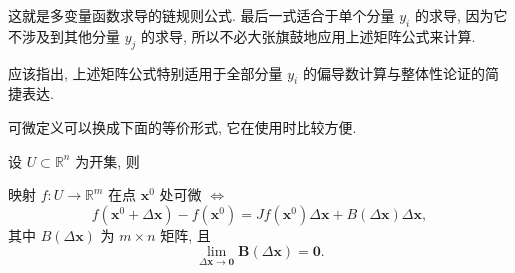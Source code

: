这就是多变量函数求导的链规则公式. 最后一式适合于单个分量 $y_{i}$ 的求导, 因为它不涉及到其他分量 $y_{j}$ 的求导, 所以不必大张旗鼓地应用上述矩阵公式来计算.

应该指出, 上述矩阵公式特别适用于全部分量 $y_{i}$ 的偏导数计算与整体性论证的简捷表达.

可微定义可以换成下面的等价形式, 它在使用时比较方便.

\begin{theorem}\label{thm:8.2.7}
设 $U \subset \mathbb{R}^{n}$ 为开集, 则

映射 $f: U \to \mathbb{R}^{m}$ 在点 $\boldsymbol{x}^{0}$ 处可微 $\Leftrightarrow$
\[
  f(\boldsymbol{x}^{0} + \Delta\boldsymbol{x}) - f(\boldsymbol{x}^{0}) = Jf(\boldsymbol{x}^{0})\Delta\boldsymbol{x} + B(\Delta\boldsymbol{x})\Delta\boldsymbol{x},
\]
其中 $B(\Delta\boldsymbol{x})$ 为 $m \times n$ 矩阵, 且
\[
  \lim_{\Delta\boldsymbol{x} \to \boldsymbol{0}}\boldsymbol{B}(\Delta\boldsymbol{x}) = \boldsymbol{0}.
\]
\end{theorem}

